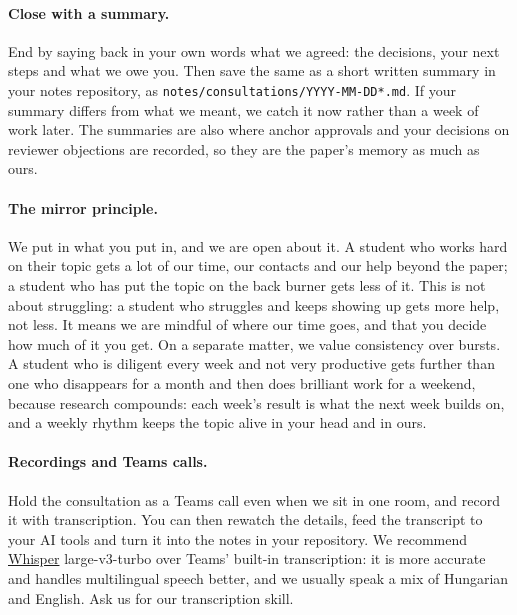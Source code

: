\paragraph{Close with a summary.} End by saying back in your own words what we agreed: the decisions, your next steps and what we owe you. Then save the same as a short written summary in your notes repository, as \texttt{notes/consultations/YYYY-MM-DD*.md}. If your summary differs from what we meant, we catch it now rather than a week of work later. The summaries are also where anchor approvals and your decisions on reviewer objections are recorded, so they are the paper's memory as much as ours.

\paragraph{The mirror principle.} We put in what you put in, and we are open about it. A student who works hard on their topic gets a lot of our time, our contacts and our help beyond the paper; a student who has put the topic on the back burner gets less of it. This is not about struggling: a student who struggles and keeps showing up gets more help, not less. It means we are mindful of where our time goes, and that you decide how much of it you get. On a separate matter, we value consistency over bursts. A student who is diligent every week and not very productive gets further than one who disappears for a month and then does brilliant work for a weekend, because research compounds: each week's result is what the next week builds on, and a weekly rhythm keeps the topic alive in your head and in ours.

\paragraph{Recordings and Teams calls.} Hold the consultation as a Teams call even when we sit in one room, and record it with transcription. You can then rewatch the details, feed the transcript to your AI tools and turn it into the notes in your repository. We recommend \href{https://github.com/openai/whisper}{Whisper} large-v3-turbo over Teams' built-in transcription: it is more accurate and handles multilingual speech better, and we usually speak a mix of Hungarian and English. Ask us for our transcription skill.

